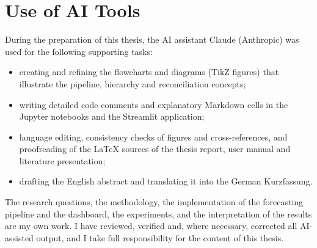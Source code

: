 %
%
%

\chapter*{Use of AI Tools}

During the preparation of this thesis, the AI assistant Claude (Anthropic) was used for the following supporting tasks:

\begin{itemize}
  \item creating and refining the flowcharts and diagrams (TikZ figures) that illustrate the pipeline, hierarchy and reconciliation concepts;
  \item writing detailed code comments and explanatory Markdown cells in the Jupyter notebooks and the Streamlit application;
  \item language editing, consistency checks of figures and cross-references, and proofreading of the \LaTeX{} sources of the thesis report, user manual and literature presentation;
  \item drafting the English abstract and translating it into the German Kurzfassung.
\end{itemize}

The research questions, the methodology, the implementation of the forecasting pipeline and the dashboard, the experiments, and the interpretation of the results are my own work. I have reviewed, verified and, where necessary, corrected all AI-assisted output, and I take full responsibility for the content of this thesis.
